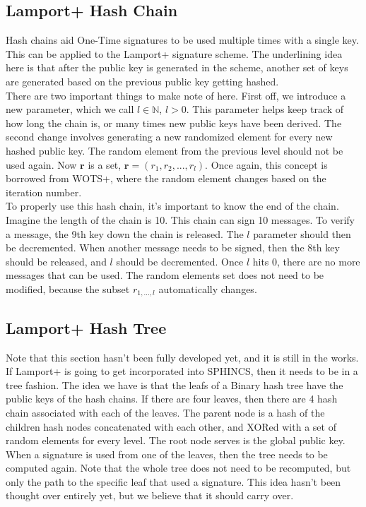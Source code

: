 \documentclass[]{scrartcl}
\begin{document}
\subsection*{Lamport+ Hash Chain}
Hash chains aid One-Time signatures to be used multiple times with a single key. This can be applied to the Lamport+ signature scheme. The underlining idea here is that after the public key is generated in the scheme, another set of keys are generated based on the previous public key getting hashed. \\
There are two important things to make note of here. First off, we introduce a new parameter, which we call $l \in \mathbb{N}$, $l > 0$. This parameter helps keep track of how long the chain is, or many times new public keys have been derived. The second change involves generating a new randomized element for every new hashed public key. The random element from the previous level should not be used again. Now $\textbf{r}$ is a set, $\textbf{r} = (r_1,r_2,...,r_l)$. Once again, this concept is borrowed from WOTS+, where the random element changes based on the iteration number.\\
To properly use this hash chain, it's important to know the end of the chain. Imagine the length of the chain is 10. This chain can sign 10 messages. To verify a message, the 9th key down the chain is released. The $l$ parameter should then be decremented. When another message needs to be signed, then the 8th key should be released, and $l$ should be decremented. Once $l$ hits 0, there are no more messages that can be used. The random elements set does not need to be modified, because the subset $r_{1,...,l}$ automatically changes.

\subsection*{Lamport+ Hash Tree}
Note that this section hasn't been fully developed yet, and it is still in the works. If Lamport+ is going to get incorporated into SPHINCS, then it needs to be in a tree fashion. The idea we have is that the leafs of a Binary hash tree have the public keys of the hash chains. If there are four leaves, then there are 4 hash chain associated with each of the leaves. The parent node is a hash of the children hash nodes concatenated with each other, and XORed with a set of random elements for every level. The root node serves is the global public key.\\
When a signature is used from one of the leaves, then the tree needs to be computed again. Note that the whole tree does not need to be recomputed, but only the path to the specific leaf that used a signature. This idea hasn't been thought over entirely yet, but we believe that it should carry over.
\end{document}
